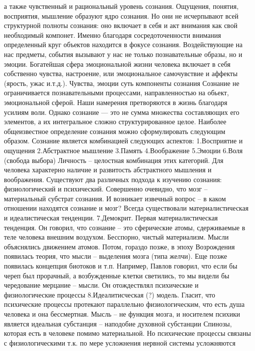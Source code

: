 \documentclass[12pt]{article}
\begin{document}
а также чувственный и рациональный уровень сознания. Ощущения, понятия, восприятия, мышление образуют
ядро  сознания.  Но  они  не  исчерпывают  всей  структурной  полноты  сознания:  оно  включает  в  себя  и  акт
внимания как свой необходимый компонет. Именно благодаря сосредоточенности внимания определенный круг
объектов находится в фокусе сознания. Воздействующие на нас предметы, события вызывают у нас не только
познавательные  образы,  но  и  эмоции.  Богатейшая  сфера  эмоциональной  жизни  человека  включает  в  себя
собственно чувства, настроение, или эмоциональное самочувствие и аффекты (ярость, ужас и.т.д.). Чувства,
эмоции  суть  компоненты  сознания  Сознание  не  ограничивается  познавательными  процессами,
направленностью на обьект, эмоциональной сферой. Наши намерения претворяются в жизнь благодаря усилиям
воли. Однако сознание — это не сумма множества составляющих его элементов, а их интегральное сложно
структурированное целое.
Наиболее  общеизвестное  определение  сознания  можно  сформулировать  следующим  образом.  Сознание
является комбинацией следующих аспектов:
1.Восприятие и ощущения 
2.Абстрактное мышление
3.Память
4.Воображение
5.Эмоции 
6.Воля (свобода выбора)
Личность – целостная комбинация этих категорий. Для человека характерно наличие и развитость абстрактного
мышления  и  воображения.  Существуют  два  различных  подхода  к  изучению  сознания:  физиологический  и
психический. 
Совершенно очевидно, что мозг – материальный субстрат сознания. И возникает извечный вопрос – в каком
отношении  находятся  сознание  и  мозг?  Всегда  существовали  материалистическая  и  идеалистическая
тенденции. 
7.Демокрит.  Первая  материалистическая  тенденция.  Он  говорил,  что  сознание  –  это  сферические  атомы, 
сдерживаемые  в  теле  человека  внешним  воздухом.  Бесспорно,  чистый  материализм.  Мысли  объяснялись
движением атомов. Потом, гораздо позже, в эпоху Возрождения появилась теория, что мысли – выделения мозга
(типа желчи). Еще позже появилась концепция биотоков и т.п. Например, Павлов говорил, что если бы череп
был прорачный,  а возбужденные  клетки  светились,  то мы видели  бы чередование  мерцание  –  мысли.  Он
отождествлял психические и физиологические процессы 
8.Идеалитисческая (?) модель. Гласит, что психические процессы протекают параллельно физиологическим, что
есть душа человека и она бессмертная. Мысль – не функция мозга, и носителем психики является идеальная
субстанция – наподобие духовной субстанции Спинозы, которая есть в человеке помимо материальной. Но
психические процессы связаны с физиологическими т.к. по мере усложнения нервной системы усложняются
\end{document}

